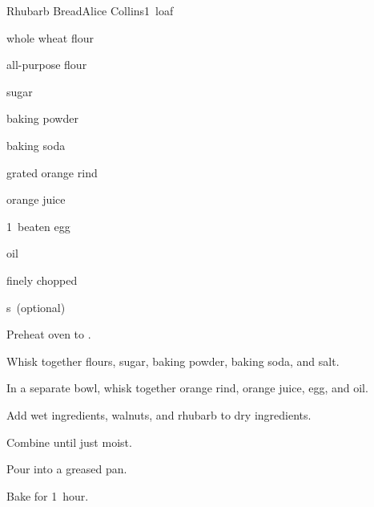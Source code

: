 \begin{recipe}{Rhubarb Bread\UNTESTED}{Alice Collins}{1~loaf}

\begin{ingredients}
\item {} whole wheat flour
\item {} all-purpose flour
\item \C{\threequarter} sugar
\item \tp{1\half} baking powder
\item \tp{1\half} baking soda
\item {} grated orange rind
\item \C{\threequarter} orange juice
\item 1~beaten egg
\item {} oil
\item \C{1\half} finely chopped 
\item \C{\half} s~(optional)
\end{ingredients}

\begin{directions}
\item Preheat oven to .
\item Whisk together flours, sugar, baking powder, baking soda, and salt.
\item In a separate bowl, whisk together orange rind, orange juice, egg, and oil.
\item Add wet ingredients, walnuts, and rhubarb to dry ingredients.
\item Combine until just moist.
\item Pour into a greased pan.
\item Bake for 1~hour.
\end{directions}

\end{recipe}
